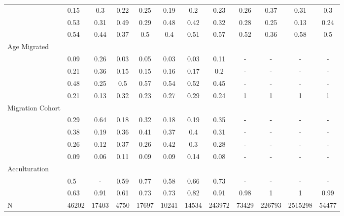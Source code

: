 \begin{table}[ht]
\begin{tabular}{>{\raggedright\arraybackslash}p{3.2cm}|lcccccc|cccc}
  \multicolumn{1}{>{\raggedleft\arraybackslash}p{2.2cm}|}{\makebox[2.2cm][r]{Lives Alone }}& 0.15 & 0.3 & 0.22 & 0.25 & 0.19 & 0.2 & 0.23 & 0.26 & 0.37 & 0.31 & 0.3 \\ 
  \multicolumn{1}{>{\raggedleft\arraybackslash}p{2.9cm}|}{\makebox[2.9cm][r]{Lives with Child }}& 0.53 & 0.31 & 0.49 & 0.29 & 0.48 & 0.42 & 0.32 & 0.28 & 0.25 & 0.13 & 0.24 \\ 
  \multicolumn{1}{>{\raggedleft\arraybackslash}p{3.4cm}|}{\makebox[3.4cm][r]{Married/Cohabiting }}& 0.54 & 0.44 & 0.37 & 0.5 & 0.4 & 0.51 & 0.57 & 0.52 & 0.36 & 0.58 & 0.5 \\ 
  Age Migrated &  &  &  &  &  &  &  &  &  &  &  \\ 
  \multicolumn{1}{>{\raggedleft\arraybackslash}p{2.4cm}|}{\makebox[2.4cm][r]{Less than 15 }}& 0.09 & 0.26 & 0.03 & 0.05 & 0.03 & 0.03 & 0.11 & - & - & - & - \\ 
  \multicolumn{1}{>{\raggedleft\arraybackslash}p{1.6cm}|}{\makebox[1.6cm][r]{15 - 23 }}& 0.21 & 0.36 & 0.15 & 0.15 & 0.16 & 0.17 & 0.2 & - & - & - & - \\ 
  \multicolumn{1}{>{\raggedleft\arraybackslash}p{1.6cm}|}{\makebox[1.6cm][r]{24 - 49 }}& 0.48 & 0.25 & 0.5 & 0.57 & 0.54 & 0.52 & 0.45 & - & - & - & - \\ 
  \multicolumn{1}{>{\raggedleft\arraybackslash}p{2.6cm}|}{\makebox[2.6cm][r]{50 and Above }}& 0.21 & 0.13 & 0.32 & 0.23 & 0.27 & 0.29 & 0.24 & 1 & 1 & 1 & 1 \\ 
  Migration Cohort &  &  &  &  &  &  &  &  &  &  &  \\ 
  \multicolumn{1}{>{\raggedleft\arraybackslash}p{2.3cm}|}{\makebox[2.3cm][r]{Before 1965 }}& 0.29 & 0.64 & 0.18 & 0.32 & 0.18 & 0.19 & 0.35 & - & - & - & - \\ 
  \multicolumn{1}{>{\raggedleft\arraybackslash}p{2.2cm}|}{\makebox[2.2cm][r]{1965 - 1979 }}& 0.38 & 0.19 & 0.36 & 0.41 & 0.37 & 0.4 & 0.31 & - & - & - & - \\ 
  \multicolumn{1}{>{\raggedleft\arraybackslash}p{2.2cm}|}{\makebox[2.2cm][r]{1980 - 1999 }}& 0.26 & 0.12 & 0.37 & 0.26 & 0.42 & 0.3 & 0.28 & - & - & - & - \\ 
  \multicolumn{1}{>{\raggedleft\arraybackslash}p{2.1cm}|}{\makebox[2.1cm][r]{After 1999 }}& 0.09 & 0.06 & 0.11 & 0.09 & 0.09 & 0.14 & 0.08 & - & - & - & - \\ 
  Acculturation &  &  &  &  &  &  &  &  &  &  &  \\ 
  \multicolumn{1}{>{\raggedleft\arraybackslash}p{1.6cm}|}{\makebox[1.6cm][r]{Citizen }}& 0.5 & - & 0.59 & 0.77 & 0.58 & 0.66 & 0.73 & - & - & - & - \\ 
  \multicolumn{1}{>{\raggedleft\arraybackslash}p{3cm}|}{\makebox[3cm][r]{English Speakers }}& 0.63 & 0.91 & 0.61 & 0.73 & 0.73 & 0.82 & 0.91 & 0.98 & 1 & 1 & 0.99 \\ 
  N & 46202 & 17403 & 4750 & 17697 & 10241 & 14534 & 243972 & 73429 & 226793 & 2515298 & 54477 \\ 
   \hline
\end{tabular}
\endgroup
\end{table}
